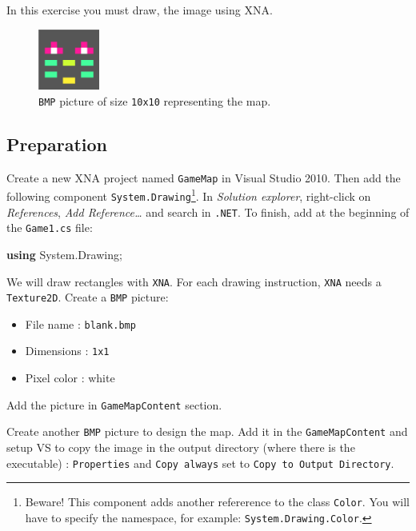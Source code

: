 \documentclass[11pt, a4paper]{article}
\newenvironment{Shaded}{}{}
\newcommand{\KeywordTok}[1]{\textcolor[rgb]{0.00,0.44,0.13}{\textbf{{#1}}}}
\newcommand{\FunctionTok}[1]{\textcolor[rgb]{0.02,0.16,0.49}{{#1}}}
\newcommand{\NormalTok}[1]{{#1}}
\begin{document}
In this exercise you must draw, the image using XNA.

\begin{figure}[h]
\begin{center}
\includegraphics[width=2cm]{../res/mapbmp.png}
\end{center}
\caption{\texttt{BMP} picture of size \texttt{10x10} representing the map.}
\end{figure}

\subsection{Preparation}\label{preparation}

Create a new XNA project named \texttt{GameMap} in Visual Studio 2010.
Then add the following component
\texttt{System.Drawing}\footnote{Beware! This component adds another refererence to the class \texttt{Color}. You will have to specify the namespace, for example: \texttt{System.Drawing.Color}.}.
In \emph{Solution explorer}, right-click on \emph{References}, \emph{Add
Reference\ldots{}} and search in \texttt{.NET}. To finish, add at the
beginning of the \texttt{Game1.cs} file:

\begin{Shaded}
\begin{Highlighting}[]
\KeywordTok{using} \NormalTok{System.}\FunctionTok{Drawing}\NormalTok{;}
\end{Highlighting}
\end{Shaded}

We will draw rectangles with \texttt{XNA}. For each drawing instruction,
\texttt{XNA} needs a \texttt{Texture2D}. Create a \texttt{BMP} picture:

\begin{itemize}
\itemsep1pt\parskip0pt
\item
  File name : \texttt{blank.bmp}
\item
  Dimensions : \texttt{1x1}
\item
  Pixel color : white
\end{itemize}

Add the picture in \texttt{GameMapContent} section.\newline

Create another \texttt{BMP} picture to design the map. Add it in the
\texttt{GameMapContent} and setup VS to copy the image in the output
directory (where there is the executable) : \texttt{Properties} and
\texttt{Copy always} set to \texttt{Copy to Output Directory}.
\end{document}
